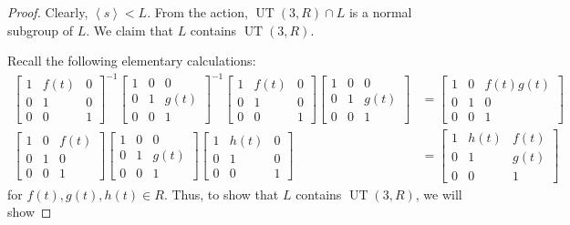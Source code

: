 \documentclass[11pt]{amsart}
\theoremstyle{definition}
\DeclareMathOperator{\UT}{UT}
\begin{document}
\begin{proof}
 Clearly, $\left< s \right> < L$.
 From the action, $\UT(3,R) \cap L$ is a normal subgroup of $L$.
 We claim that $L$ contains $\UT(3,R)$.

 Recall the following elementary calculations:
 \begin{align*}
 \begin{bmatrix} 1 & f(t) & 0 \\ 0 & 1 & 0 \\ 0 & 0 & 1 
 \end{bmatrix}^{-1} \begin{bmatrix} 1 & 0 & 0 \\ 0 & 1 & g(t) \\ 0 & 0 & 1 
 \end{bmatrix}^{-1} \begin{bmatrix} 1 & f(t) & 0 \\ 0 & 1 & 0 \\ 0 & 0 & 1 
 \end{bmatrix} \begin{bmatrix} 1 & 0 & 0 \\ 0 & 1 & g(t) \\ 0 & 0 & 1 
 \end{bmatrix} &= \begin{bmatrix} 1 & 0 & f(t)g(t) \\ 0 & 1 & 0 \\ 0 & 0 & 1 
 \end{bmatrix} \\
 \begin{bmatrix} 1 & 0 & f(t) \\ 0 & 1 & 0 \\ 0 & 0 & 1 
 \end{bmatrix} \begin{bmatrix} 1 & 0 & 0 \\ 0 & 1 & g(t) \\ 0 & 0 & 1 
 \end{bmatrix} \begin{bmatrix} 1 & h(t) & 0 \\ 0 & 1 & 0 \\ 0 & 0 & 1 
 \end{bmatrix} &= \begin{bmatrix} 1 & h(t) & f(t) \\ 0 & 1 & g(t) \\ 0 & 0 & 1 
 \end{bmatrix}
 \end{align*}
 for $f(t),g(t),h(t) \in R$.
 Thus, to show that $L$ contains $\UT(3,R)$, we will show

\end{proof}
\end{document}
